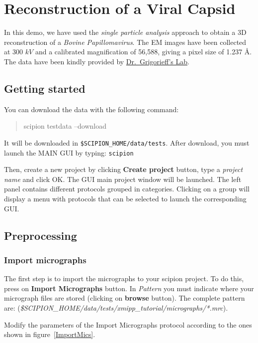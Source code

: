 \documentclass[12pt]{article} %
\newenvironment{command}{\tt\begin{quote}}{\end{quote}}
\newcommand{\comm}[1]{\texttt{#1}}
\begin{document}
\section{Reconstruction of a Viral Capsid}

In this demo, we have used the \emph{single particle analysis} approach to obtain
a 3D reconstruction of a \emph{Bovine Papillomavirus}. The EM images have been
collected at 300 $kV$ and a calibrated magnification of 56,588,  %
giving a pixel
size of 1.237 \AA  \citep{Wolf2010}. The data have been kindly
provided by \href{http://grigoriefflab.janelia.org/}{Dr.~Grigorieff’s Lab}.

\subsection{Getting started}

You can download the data with the following command:

\begin{command}
scipion testdata --download
\end{command}

It will be downloaded in \verb+$SCIPION_HOME/data/tests+. After download, you must
launch the MAIN GUI by typing: \comm{scipion}

Then, create a new project by clicking \textbf{Create project} button, type a
\textit{project name} and click OK. The GUI main project window will be launched.
The left panel contains different protocols grouped in categories. Clicking on
a group will display a menu with protocols that can be selected to launch the
corresponding GUI.

\subsection{Preprocessing}

\subsubsection{Import micrographs}

The first step is to import the micrographs to your scipion project. To do this,
press on \textbf{Import Micrographs} button. In \textit{Pattern}  you must indicate
where your micrograph files are stored (clicking on \textbf{browse} button). The
complete pattern are:
(\emph {\$SCIPION\_HOME/data/tests/xmipp\_tutorial/micrographs/*.mrc}).

Modify the parameters of the Import Micrographs protocol according to the ones
shown in figure~\ref{ImportMics}.
\end{document}
